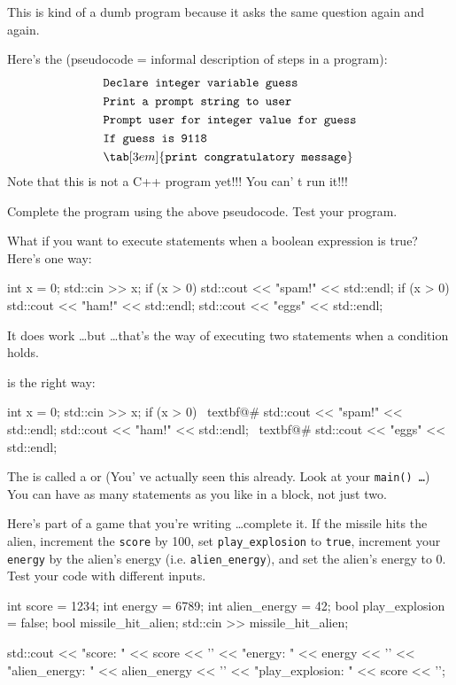 This is kind of a dumb program because it asks the same question again
and again.

Here's the  (pseudocode = informal
description of steps in a program):
\begin{align*}
& \texttt{Declare integer variable guess}\\
& \texttt{Print a prompt string to user}\\
& \texttt{Prompt user for integer value for guess}\\
& \texttt{If guess is 9118}\\
& \tab[3em]{\texttt{print congratulatory message}}\\
\end{align*}
Note that this is not a C++ program yet!!! You can' t run
it!!!

Complete the program using the above pseudocode. Test your program.

\newpage{}

What if you want to execute  statements when a
boolean expression is true? Here's one way:\\
\begin{console}[commandchars=\~\@\#]
int x = 0;
std::cin >> x;
if (x > 0)
   std::cout << "spam!" << std::endl;
if (x > 0)
   std::cout << "ham!" << std::endl;
std::cout << "eggs" << std::endl;
\end{console}

It does work \dots but \dots that's the 
way of executing two statements when a condition holds.

 is the right way:
\begin{console}[commandchars=\~\@\#]
int x = 0;
std::cin >> x;
if (x > 0)
~textbf@{#
        std::cout << "spam!" << std::endl;
        std::cout << "ham!" << std::endl;
~textbf@}#
std::cout << "eggs" << std::endl;
\end{console}

The  is called a  or (You' ve actually seen this already. Look at
your \texttt{main() \dots}) You can have as many statements as you like
in a block, not just two.

\begin{ex}
Here's part of a game that you're writing \dots complete it. If the missile hits the alien, increment the \verb!score! by 100, set \verb!play_explosion! to \verb`true`, increment your \verb!energy! by the alien's energy (i.e. \verb`alien_energy`), and set the alien's energy to 0. Test your code with different inputs.
\begin{console}
int score = 1234;
int energy = 6789;
int alien_energy = 42;
bool play_explosion = false;
bool missile_hit_alien;
std::cin >> missile_hit_alien;


std::cout << "score: " << score << '\n'
          << "energy: " << energy << '\n'
          << "alien_energy: " << alien_energy << '\n'
          << "play_explosion: " << score << '\n';
\end{console}
\end{ex}

